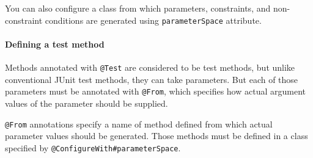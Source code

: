 \begin{Shaded}
\begin{Highlighting}[]

    \NormalTok{)}
    \NormalTok{)}
      
\end{Highlighting}
\end{Shaded}

You can also configure a class from which parameters, constraints, and
non-constraint conditions are generated using \texttt{parameterSpace}
attribute.

\paragraph{Defining a test method}\label{defining-a-test-method}

Methods annotated with \texttt{@Test} are considered to be test methods,
but unlike conventional JUnit test methods, they can take parameters.
But each of those parameters must be annotated with \texttt{@From},
which specifies how actual argument values of the parameter should be
supplied.

\begin{Shaded}
\begin{Highlighting}[]

      \NormalTok{(}\NormalTok{)}
        \NormalTok{(}
          \NormalTok{(}
          \NormalTok{(}\NormalTok{) } 
          \NormalTok{(}\NormalTok{) } 
          \NormalTok{(}\NormalTok{) } 
      \NormalTok{) \{}
      \NormalTok{\}}
\end{Highlighting}
\end{Shaded}

\texttt{@From} annotations specify a name of method defined from which
actual parameter values should be generated. Those methods must be
defined in a class specified by \texttt{@ConfigureWith\#parameterSpace}.

